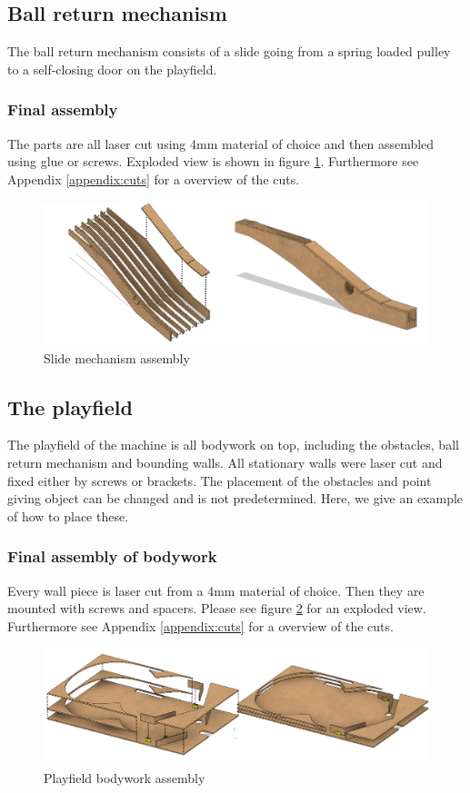 \subsection{Ball return mechanism}
The ball return mechanism consists of a slide going from a spring loaded pulley to a self-closing door on the playfield.

\subsubsection{Final assembly}
The parts are all laser cut using 4mm material of choice and then assembled using glue or screws. Exploded view is shown in figure \ref{fig:slideassembly}. Furthermore see Appendix \ref{appendix:cuts} for a overview of the cuts.
\begin{figure}
	\centering
	\includegraphics[width=\textwidth]{img/SlideMechanismAssembly}
	\caption{Slide mechanism assembly}
	\label{fig:slideassembly}
\end{figure}

\subsection{The playfield}
The playfield of the machine is all bodywork on top, including the obstacles, ball return mechanism and bounding walls. All stationary walls were laser cut and fixed either by screws or brackets. The placement of the obstacles and point giving object can be changed and is not predetermined. Here, we give an example of how to place these.

\subsubsection{Final assembly of bodywork}
Every wall piece is laser cut from a 4mm material of choice. Then they are mounted with screws and spacers. Please see figure \ref{fig:bodyassembly} for an exploded view. Furthermore see Appendix \ref{appendix:cuts} for a overview of the cuts.
\begin{figure}
	\centering
	\includegraphics[width=\textwidth]{img/PlayFieldBodyAssembly}
	\caption{Playfield bodywork assembly}
	\label{fig:bodyassembly}
\end{figure}

